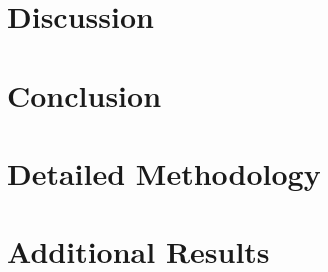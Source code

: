 \documentclass[12pt]{article}
\begin{document}
\section{Discussion}\label{sec:discussion}




\section{Conclusion}\label{sec:conclusion}




\appendix

\section{Detailed Methodology}\label{app:methodology}





\section{Additional Results}\label{app:additional}


\end{document}
